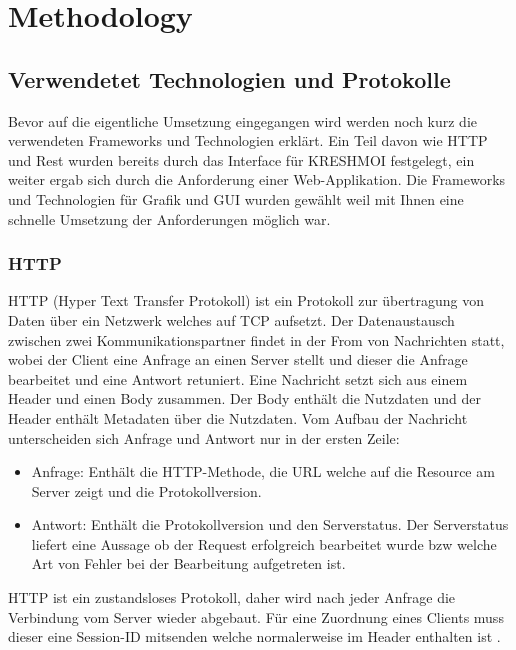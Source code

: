 \section{Methodology}
\label{sec:methodology}

\subsection{Verwendetet Technologien und Protokolle}
\label{sec:Verwendetet Technologien}
Bevor auf die eigentliche Umsetzung eingegangen wird werden noch kurz die verwendeten Frameworks und Technologien erklärt.
Ein Teil davon wie HTTP und Rest wurden bereits durch das Interface für KRESHMOI festgelegt, ein weiter ergab sich durch die Anforderung einer Web-Applikation.
Die Frameworks und Technologien für Grafik und GUI wurden gewählt weil mit Ihnen eine schnelle Umsetzung der Anforderungen möglich war.

\subsubsection{HTTP}
\label{sec:HTTP}
HTTP (Hyper Text Transfer Protokoll) ist ein Protokoll zur übertragung von Daten über ein Netzwerk welches auf TCP aufsetzt.
Der Datenaustausch zwischen zwei Kommunikationspartner findet in der From von Nachrichten statt, 
wobei der Client eine Anfrage an einen Server stellt und dieser die Anfrage bearbeitet und eine Antwort retuniert.
%
Eine Nachricht setzt sich aus einem Header und einen Body zusammen.
Der Body enthält die Nutzdaten und der Header enthält Metadaten über die Nutzdaten.
Vom Aufbau der Nachricht unterscheiden sich Anfrage und Antwort nur in der ersten Zeile:
\begin{itemize}
	\item Anfrage: Enthält die HTTP-Methode, die URL welche auf die Resource am Server zeigt und die Protokollversion.
	\item Antwort: Enthält die Protokollversion und den Serverstatus. 
		Der Serverstatus liefert eine Aussage ob der Request erfolgreich bearbeitet wurde bzw welche Art von Fehler bei der Bearbeitung aufgetreten ist.
\end{itemize}
HTTP ist ein zustandsloses Protokoll, daher wird nach jeder Anfrage die Verbindung vom Server wieder abgebaut.
Für eine Zuordnung eines Clients muss dieser eine Session-ID mitsenden welche normalerweise im Header enthalten ist \cite{http}.

